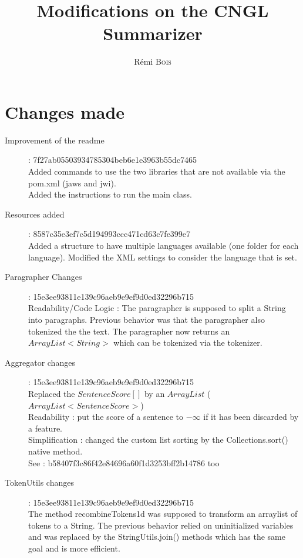 \documentclass[a4paper,10pt]{article}
\title{Modifications on the CNGL Summarizer}
\author{ Rémi \textsc{Bois}}
\begin{document}
\maketitle


\section{Changes made}
\label{sec:changes}

\begin{description}
\item [Improvement of the readme] : \hfill
  7f27ab05503934785304beb6e1e3963b55dc7465 \\
  Added commands to use the two libraries that are not available via
  the pom.xml (jaws and jwi). \\
  Added the instructions to run the main class.

\item[Resources added] : \hfill
  8587c35e3ef7c5d194993ccc471cd63c7fe399e7 \\
  Added a structure to have multiple languages available (one folder
  for each language). Modified the XML settings to consider the
  language that is set.

\item[Paragrapher Changes] : \hfill
  15e3ee93811e139c96aeb9e9ef9d0ed32296b715 \\
  Readability/Code Logic : The paragrapher is supposed to split a
  String into paragraphs. Previous behavior was that the paragrapher
  also tokenized the the text. The paragrapher now returns an
  $ArrayList<String>$ which can be tokenized via the tokenizer.

\item[Aggregator changes] : \hfill
  15e3ee93811e139c96aeb9e9ef9d0ed32296b715 \\
  Replaced the $SentenceScore[]$ by an $ArrayList$
  ($ArrayList<SentenceScore>$)\\
  Readability : put the score of a sentence to $-\infty$ if it has
  been discarded by a feature.\\
  Simplification : changed the custom list sorting by the
  Collections.sort() native method.\\
  See : b58407f3c86f42e84696a60f1d3253bff2b14786 too

\item[TokenUtils changes] : \hfill
  15e3ee93811e139c96aeb9e9ef9d0ed32296b715 \\
  The method recombineTokens1d was supposed to transform an arraylist
  of tokens to a String. The previous behavior relied on uninitialized
  variables and was replaced by the StringUtils.join() methods which
  has the same goal and is more efficient.


\end{description}
\end{document}
